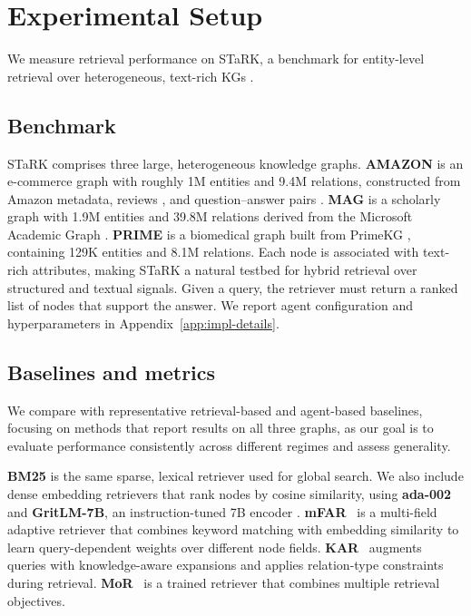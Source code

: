 
\section{Experimental Setup}
\label{sec:experiments}
We measure retrieval performance on STaRK, a benchmark for entity-level retrieval over heterogeneous, text-rich KGs \cite{wu_stark_2024}.

\subsection{Benchmark}

STaRK comprises three large, heterogeneous knowledge graphs. \textbf{AMAZON} is an e-commerce graph with roughly 1M entities and 9.4M relations, constructed from Amazon metadata, reviews \cite{he_ups_2016}, and question--answer pairs \cite{mcauley_inferring_2015}. \textbf{MAG} is a scholarly graph with 1.9M entities and 39.8M relations derived from the Microsoft Academic Graph \cite{wang_microsoft_2020}. \textbf{PRIME} is a biomedical graph built from PrimeKG \cite{chandak_building_2023}, containing 129K entities and 8.1M relations. Each node is associated with text-rich attributes, making STaRK a natural testbed for hybrid retrieval over structured and textual signals. Given a query, the retriever must return a ranked list of nodes that support the answer. We report agent configuration and hyperparameters in Appendix~\ref{app:impl-details}.

\subsection{Baselines and metrics}

We compare with representative retrieval-based and agent-based baselines, focusing on methods that report results on all three graphs, as our goal is to evaluate performance consistently across different regimes and assess generality.

 \textbf{BM25} \cite{robertson_probabilistic_2009} is the same sparse, lexical retriever used for global search. We also include dense embedding retrievers that rank nodes by cosine similarity, using \textbf{ada-002} and \textbf{GritLM-7B}, an instruction-tuned 7B encoder \cite{muennighoff_generative_2025}. \textbf{mFAR}~\cite{li_multi-field_2025} is a multi-field adaptive retriever that combines keyword matching with embedding similarity to learn query-dependent weights over different node fields. \textbf{KAR}~\cite{xia_knowledge-aware_2025} augments queries with knowledge-aware expansions and applies relation-type constraints during retrieval. \textbf{MoR}~\cite{lei_mixture_2025} is a trained retriever that combines multiple retrieval objectives.

